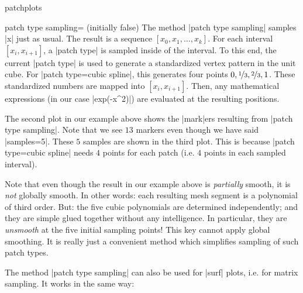 {\begin{pgfplotslibrary}{patchplots}
\begin{pgfplotskey}{patch type sampling= (initially false)}
    The method |patch type sampling| samples |x| just as usual. The result is a
    sequence $[x_0,x_1,\dotsc,x_k]$. For each interval $[x_i,x_{i+1}]$, a
    |patch type| is sampled inside of the interval. To this end, the current
    |patch type| is used to generate a standardized vertex pattern in the unit
    cube. For |patch type=cubic spline|, this generates four points $0,
    \nicefrac13, \nicefrac23, 1$. These standardized numbers are mapped into
    $[x_i, x_{i+1}]$. Then, any mathematical expressions (in our case
    |exp(-x^2)|) are evaluated at the resulting positions.

    The second plot in our example above shows the |mark|ers resulting from
    |patch type sampling|. Note that we see $13$ markers even though we have
    said |samples=5|. These $5$ samples are shown in the third plot. This is
    because |patch type=cubic spline| needs $4$ points for each patch (i.e.\@
    $4$ points in each sampled interval).

    Note that even though the result in our example above is \emph{partially}
    smooth, it is \emph{not} globally smooth. In other words: each resulting
    mesh segment is a polynomial of third order. But: the five cubic
    polynomials are determined independently; and they are simple glued
    together without any intelligence. In particular, they are \emph{unsmooth}
    at the five initial sampling points! This key cannot apply global
    smoothing. It is really just a convenient method which simplifies sampling
    of such patch types.

    The method |patch type sampling| can also be used for |surf| plots, i.e.\@
    for matrix sampling. It works in the same way:
\begin{codeexample}[]
\end{codeexample}
\end{pgfplotskey}
\end{pgfplotslibrary}}
